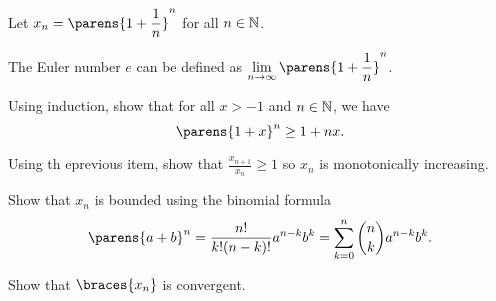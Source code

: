 \begin{problem}
  Let $\displaystyle x_n = \parens{1 + \frac{1}{n}}^n$
  for all $n \in \mathbb{N}$.

  \begin{remark}
    The Euler number $e$ can be defined as
    $\displaystyle \lim_{n \to \infty}{\parens{1 + \frac{1}{n}}^n}$.
  \end{remark}

  \begin{enumroman}
    \item Using induction, show that for all $x > -1$ and $n \in \mathbb{N}$, we have
      \[ \parens{1 + x}^n \geq 1 + nx. \]

      \begin{answer}
        
      \end{answer}

    \item Using th eprevious item, show that
      $\displaystyle  \frac{x_{n+1}}{x_n} \geq 1$ so $x_n$
      is monotonically increasing.

      \begin{answer}

      \end{answer}

    \item Show that $x_n$ is bounded using the binomial formula
      \[
        \parens{a + b}^n =
        \frac{n!}{k! (n-k)!} a^{n-k} b^k =
        \sum_{k=0}^n{\binom{n}{k} a^{n-k} b^k}.
      \]
  
      \begin{answer}

      \end{answer}

    \item Show that $\braces{x_n}$ is convergent.
  \end{enumroman}

\end{problem}
